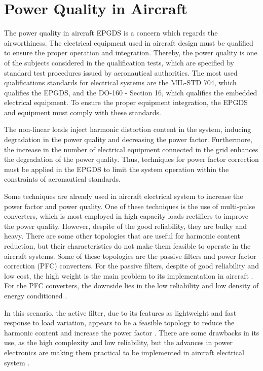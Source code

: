 \section{Power Quality in Aircraft}\label{sec:Power_Quality}

The power quality in aircraft EPGDS is a concern which regards the airworthiness. The electrical equipment used in aircraft design must be qualified to ensure the proper operation and integration. Thereby, the power quality is one of the subjects considered in the qualification tests, which are specified by standard test procedures issued by aeronautical authorities. The most used qualifications standards for electrical systems are the MIL-STD 704, which qualifies the EPGDS, and the DO-160 - Section 16, which qualifies the embedded electrical equipment. To ensure the proper equipment integration, the EPGDS  and equipment must comply with these standards.

The non-linear loads inject harmonic distortion content in the system, inducing degradation in the power quality and decreasing the power factor. Furthermore, the increase in the number of electrical equipment connected in the grid enhances the degradation of the power quality. Thus, techniques for power factor correction must be applied in the EPGDS to limit the system operation within the constraints of aeronautical standards.

Some techniques are already used in aircraft electrical system to increase the power factor and power quality. One of these techniques is the use of multi-pulse converters, which is most employed in high capacity loads rectifiers to improve the power quality. However, despite of the good reliability, they are bulky and heavy. There are some other topologies that are useful for harmonic content reduction, but their characteristics do not make them feasible to operate in the aircraft systems. Some of these topologies are the passive filters and power factor correction (PFC) converters. For the passive filters, despite of good reliability and low cost, the high weight is the main problem to its implementation in aircraft \citep{Barruel2004}. For the PFC converters, the downside lies in the low reliability and low density of energy conditioned \citep{Zhu2014,Gong2003,Lobo2005}. 

In this scenario, the active filter, due to its features as lightweight and fast response to load variation, appears to be a feasible topology to reduce the harmonic content and increase the power factor \citep{Zhu2014,Chen2012control,Karatzaferis2013}. There are some drawbacks in its use, as the high complexity and low reliability, but the advances in power electronics are making them practical to be implemented in aircraft electrical system \citep{Abdelhafez2009}.





